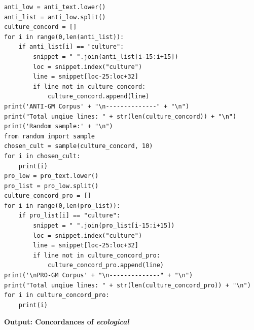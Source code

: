 \begin{lstlisting}
anti_low = anti_text.lower()
anti_list = anti_low.split()
culture_concord = []
for i in range(0,len(anti_list)):
    if anti_list[i] == "culture":
        snippet = " ".join(anti_list[i-15:i+15])
        loc = snippet.index("culture")
        line = snippet[loc-25:loc+32]
        if line not in culture_concord:
            culture_concord.append(line)
print('ANTI-GM Corpus' + "\n--------------" + "\n")             
print("Total unqiue lines: " + str(len(culture_concord)) + "\n")
print('Random sample:' + "\n") 
from random import sample
chosen_cult = sample(culture_concord, 10)
for i in chosen_cult:
    print(i)
pro_low = pro_text.lower()
pro_list = pro_low.split()
culture_concord_pro = []
for i in range(0,len(pro_list)):
    if pro_list[i] == "culture":
        snippet = " ".join(pro_list[i-15:i+15])
        loc = snippet.index("culture")
        line = snippet[loc-25:loc+32]
        if line not in culture_concord_pro:
            culture_concord_pro.append(line)
print('\nPRO-GM Corpus' + "\n--------------" + "\n")            
print("Total unqiue lines: " + str(len(culture_concord_pro)) + "\n")
for i in culture_concord_pro:
    print(i)
\end{lstlisting}

\textbf{Output: Concordances of \textit{ecological}}

